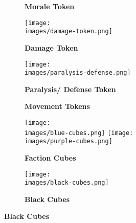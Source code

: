\begin{figure}[H]
  \centering
  \begin{subfigure}[b]{0.2\linewidth}
    \caption{\textbf{Morale Token}}
  \end{subfigure}
  \begin{subfigure}[b]{0.1\linewidth}
    \centering
    \texttt{[image: \\images/damage-token.png]}
    \caption{\textbf{Damage Token}}
  \end{subfigure}
  \begin{subfigure}[b]{0.17\linewidth}
    \centering
    \texttt{[image: \\images/paralysis-defense.png]}
    \caption{\textbf{Paralysis/ Defense Token}}
  \end{subfigure}
  \begin{subfigure}[b]{0.15\linewidth}
    \centering
    
    \caption{\textbf{Movement Tokens}}
  \end{subfigure}
  \begin{subfigure}[b]{0.15\linewidth}
    \centering
    \texttt{[image: \\images/blue-cubes.png]}
    \texttt{[image: \\images/purple-cubes.png]}
    \caption{\textbf{Faction Cubes}}
  \end{subfigure}
  \begin{subfigure}[b]{0.15\linewidth}
    \centering
    \texttt{[image: \\images/black-cubes.png]}
    \caption{\textbf{Black Cubes}}
  \end{subfigure}
\end{figure}
\vspace*{-2em}
